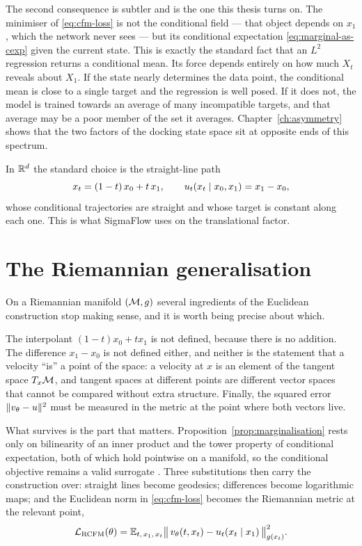 The second consequence is subtler and is the one this thesis turns on. The
minimiser of \eqref{eq:cfm-loss} is not the conditional field --- that object
depends on $x_1$, which the network never sees --- but its conditional
expectation \eqref{eq:marginal-as-cexp} given the current state. This is
exactly the standard fact that an $L^2$ regression returns a conditional mean.
Its force depends entirely on how much $X_t$ reveals about $X_1$. If the state
nearly determines the data point, the conditional mean is close to a single
target and the regression is well posed. If it does not, the model is trained
towards an average of many incompatible targets, and that average may be a
poor member of the set it averages. Chapter~\ref{ch:asymmetry} shows that the
two factors of the docking state space sit at opposite ends of this spectrum.

In $\mathbb{R}^d$ the standard choice is the straight-line path
\begin{equation}
  x_t = (1-t)\,x_0 + t\,x_1,
  \qquad
  u_t(x_t \mid x_0, x_1) = x_1 - x_0 ,
  \label{eq:linear-path}
\end{equation}
whose conditional trajectories are straight and whose target is constant along
each one. This is what SigmaFlow uses on the translational factor.

\section{The Riemannian generalisation}
\label{sec:riemannian}

On a Riemannian manifold $(\mathcal{M}, g)$ several ingredients of the Euclidean
construction stop making sense, and it is worth being precise about which.

The interpolant $(1-t)x_0 + t x_1$ is not defined, because there is no
addition. The difference $x_1 - x_0$ is not defined either, and neither is the
statement that a velocity ``is'' a point of the space: a velocity at $x$ is an
element of the tangent space $T_x\mathcal{M}$, and tangent spaces at different points
are different vector spaces that cannot be compared without extra structure.
Finally, the squared error $\|v_\theta - u\|^2$ must be measured in the
metric at the point where both vectors live.

What survives is the part that matters. Proposition~\ref{prop:marginalisation}
rests only on bilinearity of an inner product and the tower property of
conditional expectation, both of which hold pointwise on a manifold, so the
conditional objective remains a valid surrogate \citep{chen2024riemannian}.
Three substitutions then carry the construction over: straight lines become
geodesics; differences become logarithmic maps; and the Euclidean norm in
\eqref{eq:cfm-loss} becomes the Riemannian metric at the relevant point,
\begin{equation}
  \mathcal{L}_{\mathrm{RCFM}}(\theta)
  = \mathbb{E}_{t,\,x_1,\,x_t}
    \bigl\|\,v_\theta(t,x_t) - u_t(x_t \mid x_1)\,\bigr\|_{g(x_t)}^2 .
  \label{eq:rcfm-loss}
\end{equation}

